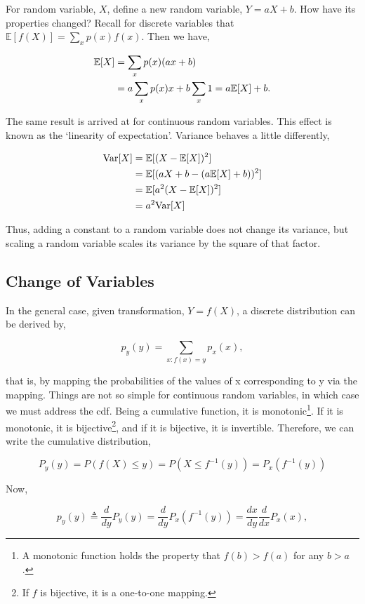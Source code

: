 \documentclass[11pt]{amsart}
\begin{document}
For random variable, $X$, define a new random variable, $Y = aX + b$. How have its properties changed? Recall for discrete variables that $\mathbb{E}[f(X)] = \sum_x p(x)f(x)$. Then we have,

\begin{align}
\mathbb{E}[X] &= \sum_x p(x)(ax + b) \notag \\
&= a\sum_x p(x)x + b\sum_x 1 = a\mathbb{E}[X] + b. \notag
\end{align}

The same result is arrived at for continuous random variables. This effect is known as the `linearity of expectation'. Variance behaves a little differently,

\begin{align}
\text{Var}[X] &= \mathbb{E}[(X - \mathbb{E}[X])^2] \notag \\
&= \mathbb{E}[(aX + b - (a\mathbb{E}[X] + b))^2] \notag \\
&= \mathbb{E}[a^2(X  - \mathbb{E}[X])^2] \notag \\
&= a^2\text{Var}[X] \notag
\end{align}

Thus, adding a constant to a random variable does not change its variance, but scaling a random variable scales its variance by the square of that factor.

\subsection{Change of Variables}

In the general case, given transformation, $Y = f(X)$, a discrete distribution can be derived by,

$$p_y(y) = \sum_{x:f(x)=y} p_x(x),$$

that is, by mapping the probabilities of the values of x corresponding to y via the mapping. Things are not so simple for continuous random variables, in which case we must address the cdf. Being a cumulative function, it is monotonic\footnote{A monotonic function holds the property that $f(b) > f(a)$ for any $b > a$.}. If it is monotonic, it is bijective\footnote{If $f$ is bijective, it is a one-to-one mapping.}, and if it is bijective, it is invertible. Therefore, we can write the cumulative distribution,

$$P_y(y) = P(f(X) \leq y) = P(X \leq f^{-1}(y)) = P_x(f^{-1}(y))$$

Now,

$$
p_y(y) \triangleq \frac{d}{dy}P_y(y) = \frac{d}{dy}P_x(f^{-1}(y)) = \frac{dx}{dy}\frac{d}{dx}P_x(x),
$$
\end{document}
